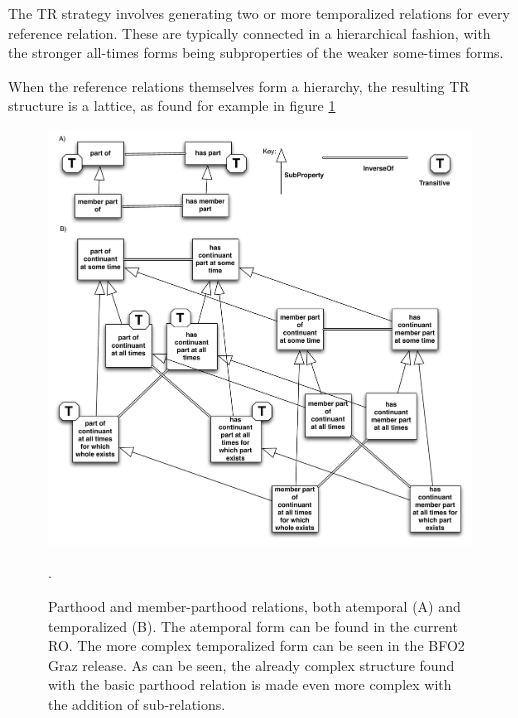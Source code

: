 \documentclass{bioinfo}
\begin{document}
The TR strategy involves generating two or more temporalized relations
for every reference relation. These are typically connected in a
hierarchical fashion, with the stronger all-times forms being
subproperties of the weaker some-times forms.

When the reference relations themselves form a hierarchy, the
resulting TR structure is a lattice, as found for example in figure \ref{fig:member-part}

\begin{figure}
\center
\includegraphics[width=14cm]{member-part}
\caption{Parthood and member-parthood relations, both atemporal (A)
  and temporalized (B). The atemporal form can be found in the current
  RO. The more complex temporalized form can be seen in the BFO2 Graz
  release. As can be seen, the already complex structure found with
  the basic parthood relation is made even more complex with the
  addition of sub-relations.}.
\label{fig:member-part}
\end{figure}
\end{document}
